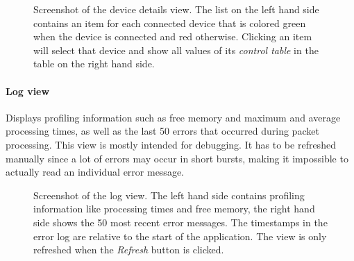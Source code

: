 \begin{figure}[H]
    \centering
    \setlength{\fboxsep}{0mm}
    \caption[Screenshot of the device details view]{
        Screenshot of the device details view. The list on the left hand side contains an item for
        each connected device that is colored green when the device is connected and red otherwise.
        Clicking an item will select that device and show all values of its \textit{control table}
        in the table on the right hand side.
    }
\end{figure}

\paragraph{Log view}

Displays profiling information such as free memory and maximum and average processing times, as well
as the last 50 errors that occurred during packet processing. This view is mostly intended for debugging.
It has to be refreshed manually since a lot of errors may occur in short bursts, making it impossible
to actually read an individual error message.

\begin{figure}[H]
    \centering
    \setlength{\fboxsep}{0mm}
    \caption[Screenshot of the log view]{
        Screenshot of the log view. The left hand side contains profiling information like processing
        times and free memory, the right hand side shows the 50 most recent error messages. The
        timestamps in the error log are relative to the start of the application. The view is only
        refreshed when the \textit{Refresh} button is clicked.
    }
\end{figure}

